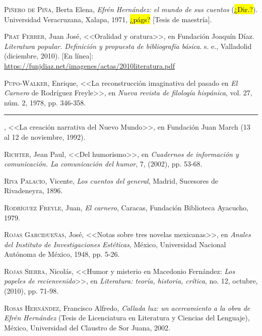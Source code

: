 \documentclass[14pt,twoside,final]{extbook} %
\begin{document}
\textsc{Piñero de Piña}, Berta Elena, \emph{Efrén Hernández: el mundo de sus cuentos} (\hl{¿Dir.?}). Universidad Veracruzana, Xalapa, 1971, \hl{¿págs?} [Tesis de maestría].\label{bib:piñero1971}

\textsc{Prat Ferrer}, Juan José, <<Oralidad y oratura>>, en Fundación Joaquín Díaz. \emph{Literatura popular. Definición y propuesta de bibliografía básica}. s. e., Valladolid (diciembre, 2010). [En línea]: \url{https://funjdiaz.net/imagenes/actas/2010literatura.pdf}

\textsc{Pupo-Walker}, Enrique, <<La reconstrucción imaginativa del pasado en \emph{El Carnero} de Rodríguez Freyle>>, en \emph{Nueva revista de filología hispánica}, vol. 27, núm. 2, 1978, pp. 346-358.\label{bib:pupowalker1978}

\rule{1cm}{0.4pt}, <<La creación narrativa del Nuevo Mundo>>, en Fundación Juan March (13 al 12 de noviembre, 1992).\label{bib:pupowalker1992}

\textsc{Richter}, Jean Paul, <<Del humorismo>>, en \emph{Cuadernos de información y comunicación. La comunicación del humor}, 7, (2002), pp. 53-68.\label{bib:richter2002}

\textsc{Riva Palacio}, Vicente, \emph{Los cuentos del general}, Madrid, Sucesores de Rivadeneyra, 1896.\label{bib:rivapalacio1896}

\textsc{Rodríguez Freyle}, Juan, \emph{El carnero}, Caracas, Fundación Biblioteca Ayacucho, 1979.\label{bib:rodriguez1979}

\textsc{Rojas Garcidueñas}, José, <<Notas sobre tres novelas mexicanas>>, en \emph{Ana\-les del Instituto de Investigaciones Estéticas}, México, Universidad Nacional Autónoma de México, 1948, pp. 5-26.\label{bib:rojas1948}

\textsc{Rojas Sierra}, Nicolás, <<Humor y misterio en Macedonio Fernández: \emph{Los papeles de recienvenido}>>, en \emph{Literatura: teoría, historia, crítica}, no. 12, octubre, (2010), pp. 71-98.\label{bib:rojas2010}

\textsc{Rosas Hernández}, Francisco Alfredo, \emph{Callada luz: un acercamiento a la obra de Efrén Hernández} (Tesis de Licenciatura en Literatura y Ciencias del Lenguaje), México, Universidad del Claustro de Sor Juana, 2002.\label{bib:rosas2002a}
\end{document}
